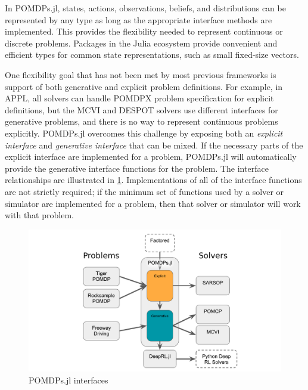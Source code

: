In POMDPs.jl, states, actions, observations, beliefs, and distributions can be represented by any type as long as the appropriate interface methods are implemented.
This provides the flexibility needed to represent continuous or discrete problems.
Packages in the Julia ecosystem provide convenient and efficient types for common state representations, such as small fixed-size vectors.

One flexibility goal that has not been met by most previous frameworks is support of both generative and explicit problem definitions.
For example, in APPL, all solvers can handle POMDPX problem specification for explicit definitions, but the MCVI and DESPOT solvers use different interfaces for generative problems, and there is no way to represent continuous problems explicitly.
POMDPs.jl overcomes this challenge by exposing both an \emph{explicit interface} and \emph{generative interface} that can be mixed.
If the necessary parts of the explicit interface are implemented for a problem, POMDPs.jl will automatically provide the generative interface functions for the problem.
The interface relationships are illustrated in \cref{fig:interfaces}.
Implementations of all of the interface functions are not strictly required; if the minimum set of functions used by a solver or simulator are implemented for a problem, then that solver or simulator will work with that problem.

\begin{figure}[htpb]
    \centering
    \includegraphics[width=0.8\linewidth]{media/interfaces.pdf}
    \caption{POMDPs.jl interfaces}
    \label{fig:interfaces}
\end{figure}

